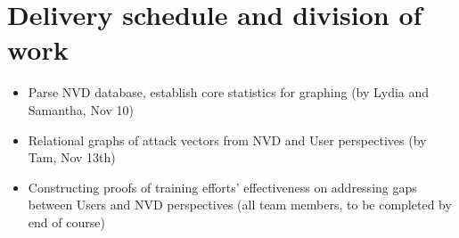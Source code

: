 \documentclass{article} %
\begin{document}
\section{Delivery schedule and division of work}

\begin{itemize}
\item Parse NVD database, establish core statistics for graphing (by Lydia and Samantha, Nov 10)
\item Relational graphs of attack vectors from NVD and User perspectives (by Tam, Nov 13th)
\item Constructing proofs of training efforts' effectiveness on addressing gaps between Users and NVD perspectives (all team members, to be completed by end of course)
\end{itemize}
\end{document}
